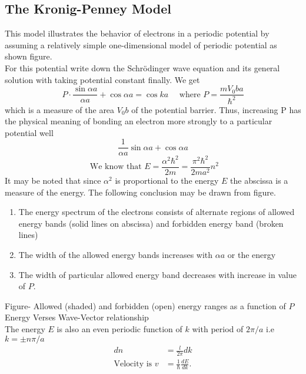 \subsection{The Kronig-Penney Model}
This model illustrates the behavior of electrons in a periodic potential by assuming a relatively simple one-dimensional model of periodic potential as shown figure.\\
For this potential write down the Schrödinger wave equation and its general solution with taking potential constant finally. We get
$$
P \cdot \frac{\sin \alpha a}{\alpha a}+\cos \alpha a=\cos k a \quad \text { where } P=\frac{m V_{0} b a}{\hbar^{2}}
$$
which is a measure of the area $V_{0} b$ of the potential barrier. Thus, increasing $\mathrm{P}$ has the physical meaning of bonding an electron more strongly to a particular potential well
$$\frac{1}{\alpha a} \sin \alpha a+\cos \alpha a$$
$$\text { We know that } E=\frac{\alpha^{2} \hbar^{2}}{2 m}=\frac{\pi^{2} \hbar^{2}}{2 m a^{2}} n^{2}$$
It may be noted that since $\alpha^{2}$ is proportional to the energy $E$ the abscissa is a measure of the energy. The following conclusion may be drawn from figure.
\begin{enumerate}[label=\roman*)]
	\item The energy spectrum of the electrons consists of alternate regions of allowed energy bands (solid lines on abscissa) and forbidden energy band (broken lines)
	\item The width of the allowed energy bands increases with $\alpha a$ or the energy
	\item The width of particular allowed energy band decreases with increase in value of $P$.
\end{enumerate} 
Figure- Allowed (shaded) and forbidden (open) energy ranges as a function of $P$\\
Energy Verses Wave-Vector relationship\\
The energy $E$ is also an even periodic function of $k$ with period of $2 \pi / a$ i.e $k=\pm n \pi / a$
\begin{align*}
d n&=\frac{l}{2 \pi} d k\\
\text{Velocity is }v&=\frac{1}{\hbar} \frac{d E}{d k}.
\end{align*}
